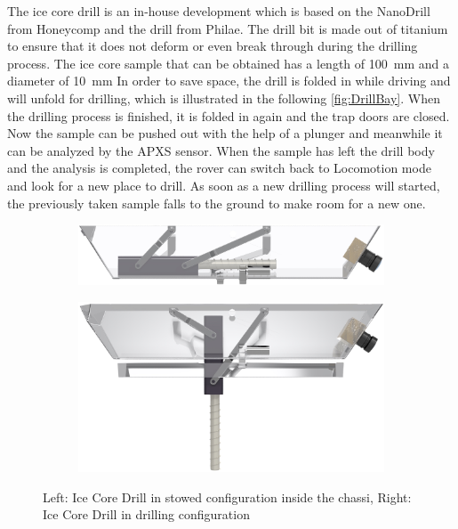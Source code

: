 The ice core drill is an in-house development which is based on the NanoDrill from Honeycomp and the drill from Philae. The drill bit is made out of titanium to ensure that it does not deform or even break through during the drilling process.
The ice core sample that can be obtained has a length of 100~mm and a diameter of 10~mm
In order to save space, the drill is folded in while driving and will unfold for drilling, which is illustrated in the following \autoref{fig:DrillBay}.
When the drilling process is finished, it is folded in again and the trap doors are closed.
Now the sample can be pushed out with the help of a plunger and meanwhile it can be analyzed by the APXS sensor. 
When the sample has left the drill body and the analysis is completed, the rover can switch back to Locomotion mode and look for a new place to drill. As soon as a new drilling process will started, the previously taken sample falls to the ground to make room for a new one.


\begin{figure}[htb]
     \centering
     \begin{subfigure}[b]{0.49\textwidth}
         \centering
         \includegraphics[width=\textwidth]{Media/DrillingBay1}
         \label{fig:stowedDrill}
     \end{subfigure}
     \hfill
     \begin{subfigure}[b]{0.49\textwidth}
         \centering
         \includegraphics[width=\textwidth]{Media/DrillingBay_unfolded1}
         \label{fig:drillconfig}
     \end{subfigure}
     \hfill
     \caption{Left: Ice Core Drill in stowed configuration inside the chassi, Right: Ice Core Drill in drilling configuration}
     \label{fig:DrillBay}
\end{figure}


